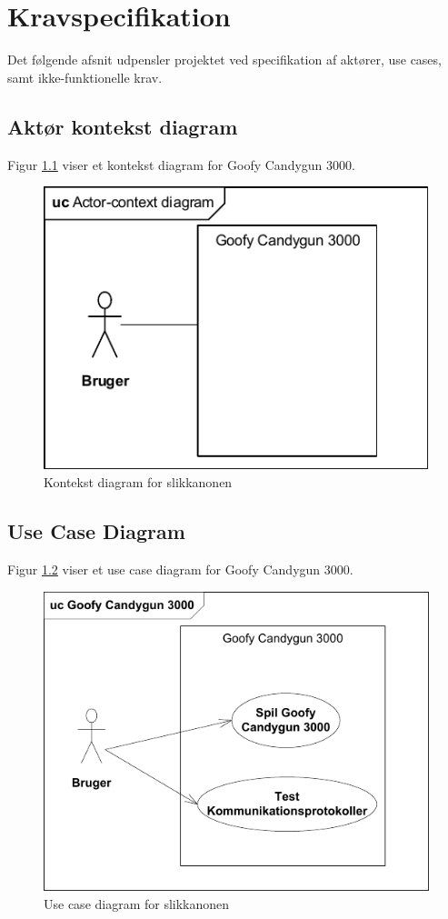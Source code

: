 \renewcommand{\labelenumii}{\theenumii}
\renewcommand{\theenumii}{\theenumi.\arabic{enumii}.}
\chapter{Kravspecifikation}
Det følgende afsnit udpensler projektet ved specifikation af aktører, use cases, samt ikke-funktionelle krav.

\section{Aktør kontekst diagram}
Figur \ref{ref:kontekstDiagram} viser et kontekst diagram for Goofy Candygun 3000.
\begin{figure}[H]
	\centering
	\includegraphics[]{Kravspecifikation/images/kontekstDiagram}
	\caption{Kontekst diagram for slikkanonen}
	\label{ref:kontekstDiagram}
\end{figure}

\section{Use Case Diagram}
Figur \ref{ref:usecaseDiagram} viser et use case diagram for Goofy Candygun 3000.
\begin{figure}[H]
	\centering
	\includegraphics[width = \textwidth]{Kravspecifikation/images/usecaseDiagram}
	\caption{Use case diagram for slikkanonen}
	\label{ref:usecaseDiagram}
\end{figure}

